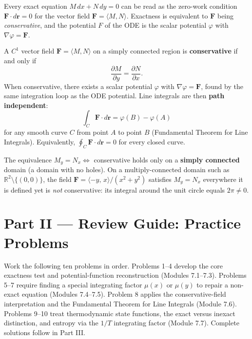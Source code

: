 Every exact equation $M\,dx + N\,dy = 0$ can be read as the zero-work
condition $\mathbf{F}\cdot d\mathbf{r}=0$ for the vector field
$\mathbf{F}=\langle M,N\rangle$. Exactness is equivalent to $\mathbf{F}$
being \emph{conservative}, and the potential $F$ of the ODE is the scalar
potential $\varphi$ with $\nabla\varphi=\mathbf{F}$.

\begin{formulabox}
A $C^1$ vector field $\mathbf{F}=\langle M,N\rangle$ on a simply connected
region is \textbf{conservative} if and only if
\[
  \frac{\partial M}{\partial y} = \frac{\partial N}{\partial x}.
\]
When conservative, there exists a scalar potential $\varphi$ with
$\nabla\varphi = \mathbf{F}$, found by the same integration loop as the ODE
potential. Line integrals are then \textbf{path independent}:
\[
  \int_C \mathbf{F}\cdot d\mathbf{r}
  = \varphi\!\left(B\right) - \varphi\!\left(A\right)
\]
for any smooth curve $C$ from point $A$ to point $B$ (Fundamental Theorem for
Line Integrals). Equivalently, $\oint_C \mathbf{F}\cdot d\mathbf{r}=0$ for
every closed curve.
\end{formulabox}

\begin{warningbox}
The equivalence $M_y = N_x \iff$ conservative holds only on a
\textbf{simply connected} domain (a domain with no holes). On a
multiply-connected domain such as $\mathbb{R}^2\setminus\{(0,0)\}$, the field
$\mathbf{F}=\langle -y,\,x\rangle/(x^2+y^2)$ satisfies $M_y=N_x$ everywhere
it is defined yet is \emph{not} conservative: its integral around the unit
circle equals $2\pi\neq 0$.
\end{warningbox}

\clearpage
{}
{}
\section*{Part II --- Review Guide: Practice Problems}

Work the following ten problems in order. Problems 1--4 develop the core
exactness test and potential-function reconstruction (Modules 7.1--7.3).
Problems 5--7 require finding a special integrating factor $\mu(x)$ or $\mu(y)$
to repair a non-exact equation (Modules 7.4--7.5). Problem 8 applies the
conservative-field interpretation and the Fundamental Theorem for Line
Integrals (Module 7.6). Problems 9--10 treat thermodynamic state functions,
the exact versus inexact distinction, and entropy via the $1/T$ integrating
factor (Module 7.7). Complete solutions follow in Part III.

